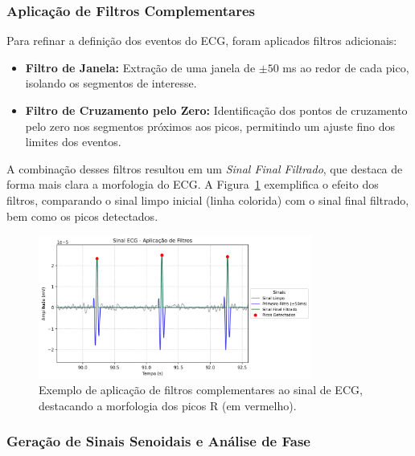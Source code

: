 \subsubsection{Aplicação de Filtros Complementares}
Para refinar a definição dos eventos do ECG, foram aplicados filtros adicionais:
\begin{itemize}
    \item \textbf{Filtro de Janela:} Extração de uma janela de \(\pm50\) ms ao redor de cada pico, isolando os segmentos de interesse.
    \item \textbf{Filtro de Cruzamento pelo Zero:} Identificação dos pontos de cruzamento pelo zero nos segmentos próximos aos picos, permitindo um ajuste fino dos limites dos eventos.
\end{itemize}
A combinação desses filtros resultou em um \emph{Sinal Final Filtrado}, que destaca de forma mais clara a morfologia do ECG. A Figura~\ref{fig:ecg_filtros_aplicados} exemplifica o efeito dos filtros, comparando o sinal limpo inicial (linha colorida) com o sinal final filtrado, bem como os picos detectados.

\begin{figure}[htb]
    \centering
    \includegraphics[width=0.8\textwidth]{figs/2_preprocessamento_ecg/2_Sinal_ECG_-_Aplicação_de_Filtros_zoom.png}
    \caption{Exemplo de aplicação de filtros complementares ao sinal de ECG, destacando a morfologia dos picos R (em vermelho).}
    \label{fig:ecg_filtros_aplicados}
\end{figure}
\subsubsection{Geração de Sinais Senoidais e Análise de Fase}

